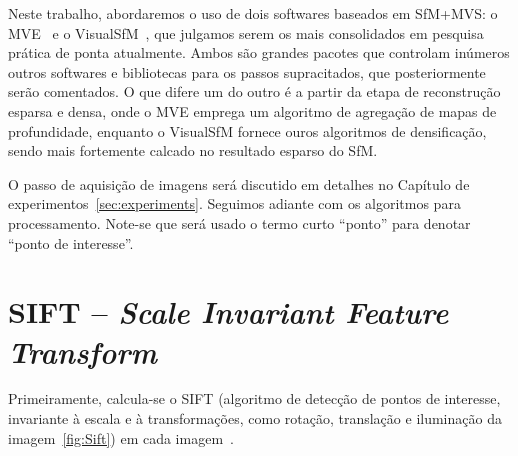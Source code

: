 Neste trabalho, abordaremos o uso de dois softwares baseados em SfM+MVS: o
MVE~\cite{mve} e o VisualSfM~\cite{wu2011visualsfm}, que julgamos serem os mais
consolidados em pesquisa prática de ponta atualmente. Ambos são grandes pacotes
que controlam inúmeros outros softwares e bibliotecas para os passos
supracitados, que posteriormente serão comentados. O que difere um do outro é a
partir da etapa de reconstrução esparsa e densa, onde o MVE emprega um algoritmo
de agregação de mapas de profundidade, enquanto o VisualSfM fornece ouros
algoritmos de densificação, sendo mais fortemente calcado no resultado esparso do SfM.

O passo de aquisição de imagens será discutido em detalhes no Capítulo de
experimentos~\ref{sec:experiments}. Seguimos adiante com os algoritmos para
processamento. Note-se que será usado o termo curto ``ponto'' para denotar
``ponto de interesse''.

\section{SIFT -- \emph{Scale Invariant Feature Transform}}

Primeiramente, calcula-se o SIFT (algoritmo de detecção de pontos de interesse,
invariante à escala e à transformações, como rotação, translação e iluminação da
imagem~\ref{fig:Sift}) em cada imagem~\cite{Lowe:IJCV2004}.

